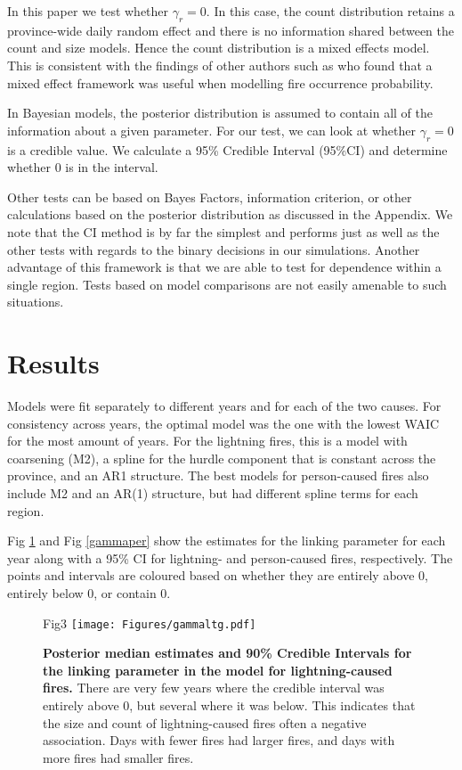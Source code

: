 \documentclass[10pt,letterpaper]{article}
\begin{document}
In this paper we test whether \(\gamma_r=0\). In this case, the count
distribution retains a province-wide daily random effect and
there is no information shared between the count and size models. Hence the count
distribution is a mixed effects model. This is consistent with the findings of other authors such as
\cite{brillingerProbabilisticRiskAssessment2006} who found that a mixed effect framework was useful when modelling fire occurrence probability.

In Bayesian models, the posterior distribution is assumed to contain all
of the information about a given parameter. For our test, we can look at
whether \(\gamma_r = 0\) is a credible value. We calculate a 95\% Credible
Interval (95\%CI) and determine whether 0 is in the interval.

Other tests can be based on Bayes Factors, information criterion, or
other calculations based on the posterior distribution as discussed in
the Appendix. We note that the CI method is by far the simplest and
performs just as well as the other tests with regards to the binary
decisions in our simulations. Another advantage of this framework is
that we are able to test for dependence within a single region.
Tests based on model comparisons are not easily amenable to such
situations.

\hypertarget{results}{%
\section{Results}\label{results}}

Models were fit separately to different years and for each of the
two causes. For consistency across years, the optimal model was the one
with the lowest WAIC for the most amount of years. For the lightning
fires, this is a model with coarsening (M2), a spline for the hurdle
component that is constant across the province, and an AR1 structure.
The best models for person-caused fires also include M2 and an AR(1)
structure, but had different spline terms for each region.

Fig \ref{gammaltg} and Fig \ref{gammaper} show the estimates for the
linking parameter for each year along with a 95\% CI for lightning- and person-caused fires, respectively. The points and intervals are coloured based on whether they
are entirely above 0, entirely below 0, or contain 0.

\begin{figure}[h!]
\centering
Fig3
\texttt{[image: Figures/gammaltg.pdf]}
\caption{\label{gammaltg}\textbf{Posterior median estimates and 90\% Credible
Intervals for the linking parameter in the model for lightning-caused
fires.} There are very few years where the credible interval was entirely
above 0, but several where it was below. This indicates that the size and
count of lightning-caused fires often a negative association.
Days with fewer fires had larger fires, and days with more fires had
smaller fires.}
\end{figure}
\end{document}
